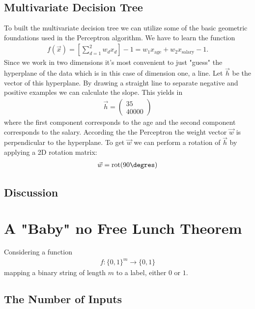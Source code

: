 \documentclass[12pt]{article}
\begin{document}
\subsection{Multivariate Decision Tree}

To built the multivariate decision tree we can utilize some of the basic geometric foundations used in the Perceptron algorithm. We have to learn the function
\begin{align}
f(\vec{x})=\left[\sum_{d=1}^{2}w_dx_d\right]-1=w_1x_\text{age}+w_2x_\text{salary}-1.
\end{align}
Since we work in two dimensions it's most convenient to just "guess" the hyperplane of the data which is in this case of dimension one, a line. Let $\vec{h}$ be the vector of this hyperplane. By drawing a straight line to separate negative and positive examples we can calculate the slope. This yields in 
\begin{align*}
\vec{h} = \begin{pmatrix}35 \\ 40000\end{pmatrix}
\end{align*}
where the first component corresponds to the age and the second component corresponds to the salary. According the the Perceptron the weight vector $\vec{w}$ is perpendicular to the hyperplane. To get $\vec{w}$ we can perform a rotation of $\vec{h}$ by applying a 2D rotation matrix:
\begin{align*}
\vec{w}=\text{rot}(90\degres)
\end{align*}

\subsection{Discussion}

\section{A "Baby" no Free Lunch Theorem}

Considering a function
\begin{align}
f:\{0,1\}^m\rightarrow \{0,1\}
\end{align}
mapping a binary string of length $m$ to a label, either $0$ or $1$. 

\subsection{The Number of Inputs}
\end{document}
